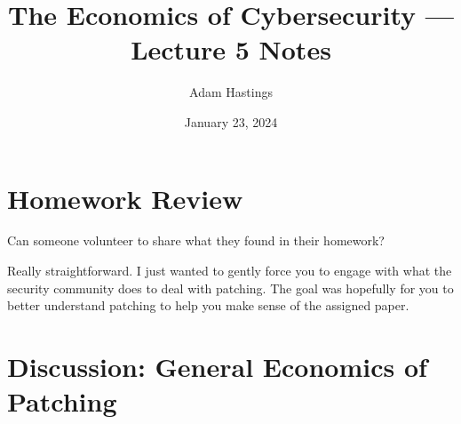 \documentclass[11pt]{article}
\title{The Economics of Cybersecurity --- Lecture 5 Notes}
\date{January 23, 2024}
\author{Adam Hastings}
\begin{document}
\maketitle


\section*{Homework Review}

Can someone volunteer to share what they found in their homework?

Really straightforward. I just wanted to gently force you to engage with what the security community does to deal with patching. The goal was hopefully for you to better understand patching to help you make sense of the assigned paper. 

\section*{Discussion: General Economics of Patching}
\end{document}
